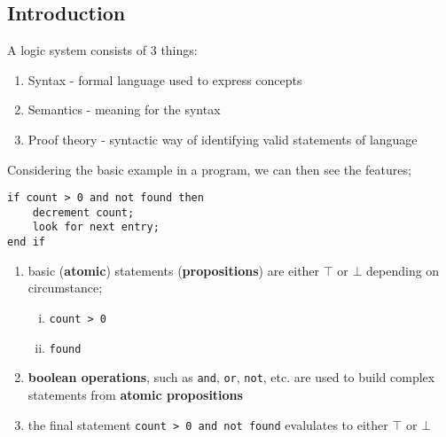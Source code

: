 \documentclass[a4paper, 12pt]{article}
\begin{document}
        \subsection*{Introduction}
        A logic system consists of 3 things:
        \begin{enumerate}[1.]
            \item Syntax - formal language used to express concepts
            \item Semantics - meaning for the syntax
            \item Proof theory - syntactic way of identifying valid statements of language
        \end{enumerate}
        Considering the basic example in a program, we can then see the features;
        \begin{verbatim}
if count > 0 and not found then
    decrement count;
    look for next entry;
end if
        \end{verbatim}
        \begin{enumerate}[1.]
            \item basic (\textbf{atomic}) statements (\textbf{propositions}) are either $\top$ or $\bot$ depending on circumstance;
                \begin{enumerate}[i.]
                    \item \texttt{count > 0}
                    \item \texttt{found}
                \end{enumerate}
            \item \textbf{boolean operations}, such as \texttt{and}, \texttt{or}, \texttt{not}, etc. are used to build complex statements from \textbf{atomic propositions}
            \item the final statement \texttt{count > 0 and not found} evalulates to either $\top$ or $\bot$
        \end{enumerate}
\end{document}
